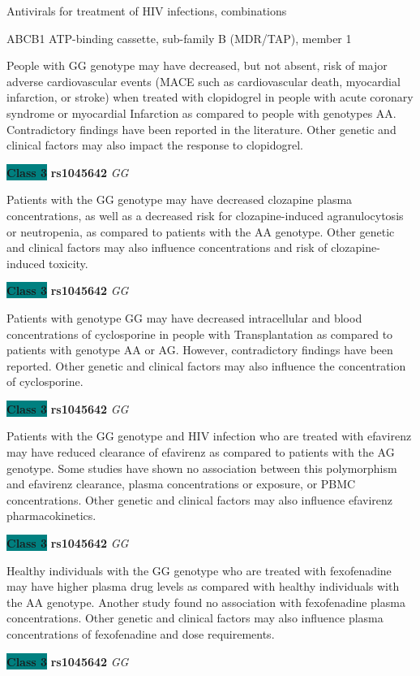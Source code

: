 \documentclass{resume} %
\begin{document}
\begin{rSection}{ Antivirals for treatment of HIV infections, combinations }
\begin{rSubsection}{ ABCB1 }{ ATP-binding cassette, sub-family B (MDR/TAP), member 1 }{}{}
\item[] People with GG  genotype may have decreased, but not absent, risk of major adverse cardiovascular events (MACE such as cardiovascular death, myocardial infarction, or stroke) when treated with clopidogrel in people with acute coronary syndrome or myocardial Infarction as compared to people with genotypes AA. Contradictory findings have been reported in the literature. Other genetic and clinical factors may also impact the response to clopidogrel.\item \textbf{\colorbox{teal} {Class 3}} \textbf{ rs1045642 } \textit{ GG }
\item[] Patients with the GG genotype may have decreased clozapine plasma concentrations, as well as a decreased risk for clozapine-induced agranulocytosis or neutropenia, as compared to patients with the AA genotype. Other genetic and clinical factors may also influence concentrations and risk of clozapine-induced toxicity. \item \textbf{\colorbox{teal} {Class 3}} \textbf{ rs1045642 } \textit{ GG }
\item[] Patients with genotype GG may have decreased intracellular and blood concentrations of cyclosporine in people with Transplantation as compared to patients with genotype AA or AG. However, contradictory findings have been reported. Other genetic and clinical factors may also influence the concentration of cyclosporine.\item \textbf{\colorbox{teal} {Class 3}} \textbf{ rs1045642 } \textit{ GG }
\item[] Patients with the GG genotype and HIV infection who are treated with efavirenz may have reduced clearance of efavirenz as compared to patients with the AG genotype. Some studies have shown no association between this polymorphism and efavirenz clearance, plasma concentrations or exposure, or PBMC concentrations. Other genetic and clinical factors may also influence efavirenz pharmacokinetics. \item \textbf{\colorbox{teal} {Class 3}} \textbf{ rs1045642 } \textit{ GG }
\item[] Healthy individuals with the GG genotype who are treated with fexofenadine may have higher plasma drug levels as compared with healthy individuals with the AA genotype. Another study found no association with fexofenadine plasma concentrations. Other genetic and clinical factors may also influence plasma concentrations of fexofenadine and dose requirements.\item \textbf{\colorbox{teal} {Class 3}} \textbf{ rs1045642 } \textit{ GG }

\end{rSubsection}
\end{rSection}
\end{document}
